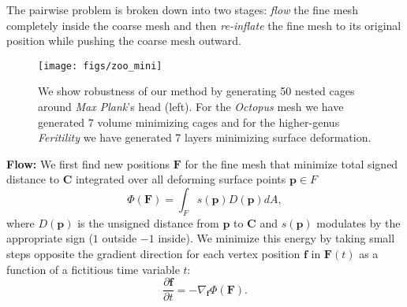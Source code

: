\documentclass{cgyrf15}
\begin{document}
The pairwise problem is broken down into two stages: \emph{flow} the fine mesh
completely inside the coarse mesh  
and then \emph{re-inflate} the
fine mesh to its original position while pushing the coarse mesh
outward.\\[0.5em]
%
\begin{figure*}[t]
  \texttt{[image: figs/zoo\_mini]}
  \caption{We show robustness of our method by generating 50 nested cages
  around \emph{Max Plank}'s head (left). For the \emph{Octopus} mesh we have
  generated 7 volume minimizing cages and for the higher-genus
  \emph{Feritility} we have generated 7 layers minimizing surface deformation.
  }
  \label{fig:minizoo}
  \vspace{-0.2cm}
\end{figure*}
%
\noindent \textbf{Flow:} We first find new positions $\mathbf{F}$ for the fine
mesh that minimize total signed distance to $\mathbf{C}$ integrated over all
deforming surface points $\textbf{p} \in F$ \begin{equation}
\Phi(\mathbf{F}) = \int_F s(\mathbf{p})
D(\mathbf{p}) dA, \label{eq:flow_energy} \end{equation} where
$D(\mathbf{p})$ is the unsigned distance from $\mathbf{p}$ to $\mathbf{C} $
and $s(\mathbf{p})$ modulates by the appropriate sign
($1$ outside $-1$ inside). We minimize this energy by taking small steps opposite the gradient direction
for each vertex position $\mathbf{f}$ in $\mathbf{F}(t)$
as a function of a fictitious time variable $t$:
\begin{equation}
\frac{\partial \mathbf{f}}{\partial t} = - \nabla_{\mathbf{f}} \Phi(\mathbf{F}).
\label{eq:energy_gradient}
\end{equation}

\end{document}

